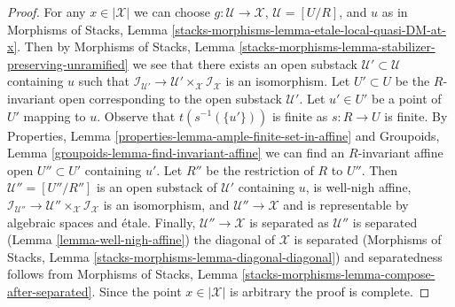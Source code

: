 \documentclass[10pt,a4paper]{amsart}
\theoremstyle{plain}
\theoremstyle{definition}
\theoremstyle{remark}
\numberwithin{equation}{subsection}
\begin{document}
\begin{proof}
For any $x \in |\mathcal{X}|$ we can choose
$g : \mathcal{U} \to \mathcal{X}$, $\mathcal{U} = [U/R]$, and $u$ as in
Morphisms of Stacks,
Lemma \ref{stacks-morphisms-lemma-etale-local-quasi-DM-at-x}.
Then by
Morphisms of Stacks, Lemma
\ref{stacks-morphisms-lemma-stabilizer-preserving-unramified}
we see that there exists an open substack
$\mathcal{U}' \subset \mathcal{U}$ containing $u$
such that $\mathcal{I}_{\mathcal{U}'} \to
\mathcal{U}' \times_\mathcal{X} \mathcal{I}_\mathcal{X}$
is an isomorphism.
Let $U' \subset U$ be the $R$-invariant open corresponding to
the open substack $\mathcal{U}'$.
Let $u' \in U'$ be a point of $U'$ mapping to $u$.
Observe that $t(s^{-1}(\{u'\}))$ is finite as $s : R \to U$ is finite.
By Properties, Lemma \ref{properties-lemma-ample-finite-set-in-affine}
and Groupoids, Lemma \ref{groupoids-lemma-find-invariant-affine}
we can find an $R$-invariant affine open $U'' \subset U'$
containing $u'$. Let $R''$ be the restriction of $R$ to $U''$.
Then $\mathcal{U}'' = [U''/R'']$ is an open substack of
$\mathcal{U}'$ containing $u$, is well-nigh affine,
$\mathcal{I}_{\mathcal{U}''} \to
\mathcal{U}'' \times_\mathcal{X} \mathcal{I}_\mathcal{X}$
is an isomorphism, and $\mathcal{U}'' \to \mathcal{X}$
and is representable by algebraic spaces and \'etale.
Finally, $\mathcal{U}'' \to \mathcal{X}$ is separated as
$\mathcal{U}''$ is separated (Lemma \ref{lemma-well-nigh-affine})
the diagonal of $\mathcal{X}$ is separated
(Morphisms of Stacks, Lemma \ref{stacks-morphisms-lemma-diagonal-diagonal})
and separatedness follows from Morphisms of Stacks, Lemma
\ref{stacks-morphisms-lemma-compose-after-separated}.
Since the point $x \in |\mathcal{X}|$ is arbitrary the proof is complete.
\end{proof}
\end{document}
